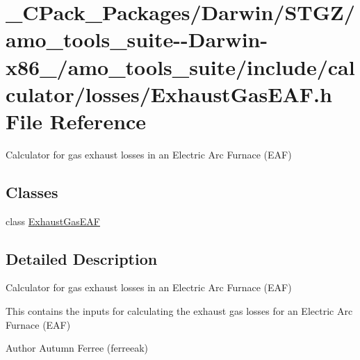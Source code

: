 \hypertarget{___c_pack___packages_2_darwin_2_s_t_g_z_2amo__tools__suite--_darwin-x86__64_2amo__tools__suite_2c5136a7303077cb660b86ee43dc41ed7}{}\section{\+\_\+\+C\+Pack\+\_\+\+Packages/\+Darwin/\+S\+T\+G\+Z/amo\+\_\+tools\+\_\+suite-\/-\/\+Darwin-\/x86\+\_/amo\+\_\+tools\+\_\+suite/include/calculator/losses/\+Exhaust\+Gas\+E\+AF.h File Reference}
\label{___c_pack___packages_2_darwin_2_s_t_g_z_2amo__tools__suite--_darwin-x86__64_2amo__tools__suite_2c5136a7303077cb660b86ee43dc41ed7}


Calculator for gas exhaust losses in an Electric Arc Furnace (E\+AF)  


\subsection*{Classes}
\begin{DoxyCompactItemize}
\item 
class \hyperlink{class_exhaust_gas_e_a_f}{Exhaust\+Gas\+E\+AF}
\end{DoxyCompactItemize}


\subsection{Detailed Description}
Calculator for gas exhaust losses in an Electric Arc Furnace (E\+AF) 

This contains the inputs for calculating the exhaust gas losses for an Electric Arc Furnace (E\+AF)

\begin{DoxyAuthor}{Author}
Autumn Ferree (ferreeak) 
\end{DoxyAuthor}
